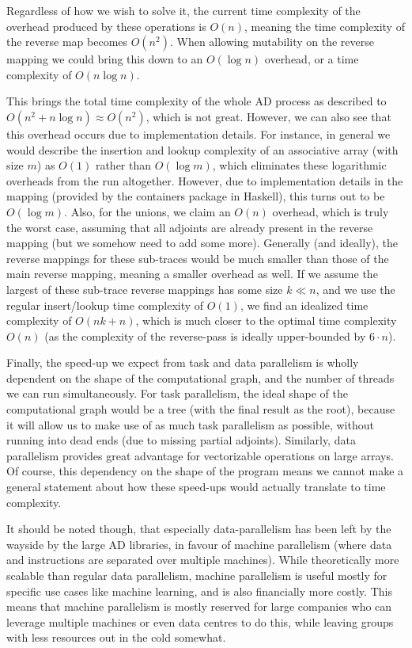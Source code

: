         Regardless of how we wish to solve it, the current time complexity of the overhead produced by these operations is $O(n)$, meaning the time complexity of the reverse map becomes $O(n^2)$.
        When allowing mutability on the reverse mapping we could bring this down to an $O(\log n)$ overhead, or a time complexity of $O(n\log n)$.
        
        This brings the total time complexity of the whole AD process as described to $O(n^2+n\log n)\approx O(n^2)$, which is not great.
        However, we can also see that this overhead occurs due to implementation details.
        For instance, in general we would describe the insertion and lookup complexity of an associative array (with size $m$) as $O(1)$ rather than $O(\log m)$, which eliminates these logarithmic overheads from the run altogether.
        However, due to implementation details in the mapping (provided by the containers package in Haskell), this turns out to be $O(\log m)$.
        Also, for the unions, we claim an $O(n)$ overhead, which is truly the worst case, assuming that all adjoints are already present in the reverse mapping (but we somehow need to add some more).
        Generally (and ideally), the reverse mappings for these sub-traces would be much smaller than those of the main reverse mapping, meaning a smaller overhead as well.
        If we assume the largest of these sub-trace reverse mappings has some size $k\ll n$, and we use the regular insert/lookup time complexity of $O(1)$, we find an idealized time complexity of $O(nk+n)$, which is much closer to the optimal time complexity $O(n)$ (as the complexity of the reverse-pass is ideally upper-bounded by $6\cdot n$).

        Finally, the speed-up we expect from task and data parallelism is wholly dependent on the shape of the computational graph, and the number of threads we can run simultaneously.
        For task parallelism, the ideal shape of the computational graph would be a tree (with the final result as the root), because it will allow us to make use of as much task parallelism as possible, without running into dead ends (due to missing partial adjoints).
        Similarly, data parallelism provides great advantage for vectorizable operations on large arrays.
        Of course, this dependency on the shape of the program means we cannot make a general statement about how these speed-ups would actually translate to time complexity.
        
        It should be noted though, that especially data-parallelism has been left by the wayside by the large AD libraries, in favour of machine parallelism (where data and instructions are separated over multiple machines).
        While theoretically more scalable than regular data parallelism, machine parallelism is useful mostly for specific use cases like machine learning, and is also financially more costly.
        This means that machine parallelism is mostly reserved for large companies who can leverage multiple machines or even data centres to do this, while leaving groups with less resources out in the cold somewhat.